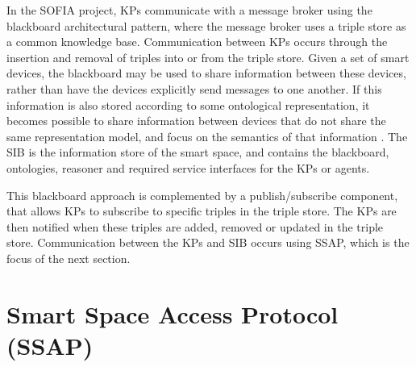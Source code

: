 In the \ac{SOFIA} project, \acp{KP} communicate with a message broker using the blackboard architectural pattern, where the message broker uses a triple store as a common knowledge base. Communication between \acp{KP} occurs through the insertion and removal of triples into or from the triple store.  Given a set of smart devices, the blackboard may be used to share information between these devices, rather than have the devices explicitly send messages to one another. If this information is also stored according to some ontological representation, it becomes possible to share information between devices that do not share the same representation model, and focus on the semantics of that information \cite{Oliver2008}. The \ac{SIB} is the information store of the smart space, and contains the blackboard, ontologies, reasoner and required service interfaces for the \acp{KP} or agents.

This blackboard approach is complemented by a publish/subscribe component, that allows \acp{KP} to subscribe to specific triples in the triple store. The \acp{KP} are then notified when these triples are added, removed or updated in the triple store. Communication between the \acp{KP} and \ac{SIB} occurs using \ac{SSAP}, which is the focus of the next section.











\section{Smart Space Access Protocol (SSAP)}
\label{ssap}


